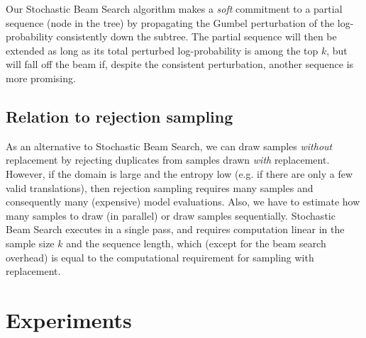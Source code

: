 Our Stochastic Beam Search algorithm makes a \emph{soft} commitment to a partial sequence (node in the tree) by propagating the Gumbel perturbation of the log-probability consistently down the subtree. The partial sequence will then be extended as long as its total perturbed log-probability is among the top $k$, but will fall off the beam if, despite the consistent perturbation, another sequence is more promising. 

\subsection{Relation to rejection sampling}
As an alternative to Stochastic Beam Search, we can draw samples \emph{without} replacement by rejecting duplicates from samples drawn \emph{with} replacement. However, if the domain is large and the entropy low (e.g. if there are only a few valid translations), then rejection sampling requires many samples and consequently many (expensive) model evaluations. Also, we have to estimate how many samples to draw (in parallel) or draw samples sequentially. Stochastic Beam Search executes in a single pass, and requires computation linear in the sample size $k$ and the sequence length, which (except for the beam search overhead) is equal to the computational requirement for sampling with replacement.

\section{Experiments}
\label{sec:experiments}

